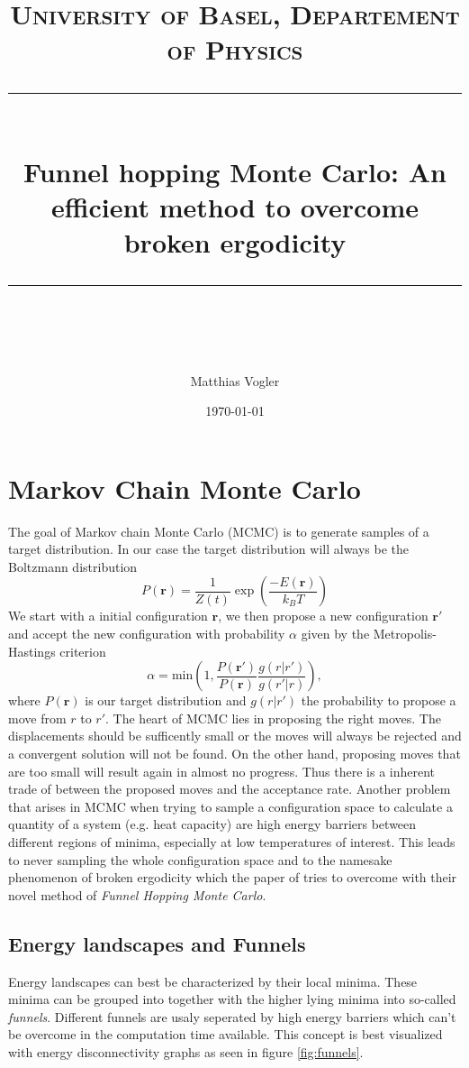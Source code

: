 \documentclass[11pt]{scrartcl} %
\title{	
	\normalfont\normalsize
	\textsc{University of Basel, Departement of Physics}\\ %
	\vspace{25pt} %
	\rule{\linewidth}{0.5pt}\\ %
	\vspace{20pt} %
	{\huge Funnel hopping Monte Carlo: An efficient
method to overcome broken ergodicity \cite{Finkler2020}}\\ %
	\vspace{12pt} %
	\rule{\linewidth}{2pt}\\ %
	\vspace{12pt} %
}
\author{\LARGE Matthias Vogler} %
\date{\normalsize\today} %
\begin{document}
\maketitle %


\section{Markov Chain Monte Carlo}
The goal of Markov chain Monte Carlo (MCMC) is to generate samples of a target distribution. In our case the target distribution will always be the Boltzmann distribution
\begin{equation}
	P(\mathbf{r})=\frac{1}{Z(t)}\exp\left(\frac{-E(\mathbf{r})}{k_B T}\right)
\end{equation}
We start with a initial configuration $\mathbf{r}$, we then propose a new configuration $\mathbf{r}'$ and accept the new configuration with probability $\alpha$ given by the Metropolis-Hastings criterion \cite{Hastings1970}
\begin{equation}
	\alpha=\text{min}\left(1,\frac{P(\mathbf{r}')}{P(\mathbf{r})}\frac{g(r|r')}{g(r'|r)}\right),
	\label{metropolis}
\end{equation}
where $P(\mathbf{r})$ is our target distribution and $g(r|r')$ the probability to propose a move from $r$ to $r'$. The heart of MCMC lies in proposing the right moves. The displacements should be sufficently small or the moves will always be rejected and a convergent solution will not be found. On the other hand, proposing moves that are too small will result again in almost no progress. Thus there is a inherent trade of between the proposed moves and the acceptance rate. Another problem that arises in MCMC when trying to sample a configuration space to calculate a quantity of a system (e.g. heat capacity) are high energy barriers between different regions of minima, especially at low temperatures of interest. This leads to never sampling the whole configuration space and to the namesake phenomenon of broken ergodicity which the paper of \citeauthor{Finkler2020} tries to overcome with their novel method of \emph{Funnel Hopping Monte Carlo}.\\
\subsection{Energy landscapes and Funnels}
Energy landscapes can best be characterized by their local minima. These minima can be grouped into together with the higher lying minima into so-called \emph{funnels}. Different funnels are usaly seperated by high energy barriers which can't be overcome in the computation time available. This concept is best visualized with energy disconnectivity graphs as seen in figure \ref{fig:funnels}.
\end{document}
